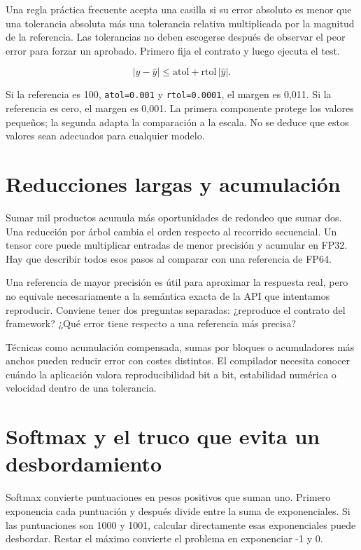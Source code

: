 \documentclass[12pt,a4paper,oneside]{report}
\begin{document}
Una regla práctica frecuente acepta una casilla si su error absoluto es menor que una tolerancia absoluta más una tolerancia relativa multiplicada por la magnitud de la referencia. Las tolerancias no deben escogerse después de observar el peor error para forzar un aprobado. Primero fija el contrato y luego ejecuta el test.

\[
|y-\widehat y|\leq \mathrm{atol}+\mathrm{rtol}\,|\widehat y|.
\]
\begin{ejemplo}
Si la referencia es 100, \texttt{atol=0.001} y \texttt{rtol=0.0001}, el margen es 0,011. Si la referencia es cero, el margen es 0,001. La primera componente protege los valores pequeños; la segunda adapta la comparación a la escala. No se deduce que estos valores sean adecuados para cualquier modelo.

\end{ejemplo}
\section{Reducciones largas y acumulación}
Sumar mil productos acumula más oportunidades de redondeo que sumar dos. Una reducción por árbol cambia el orden respecto al recorrido secuencial. Un tensor core puede multiplicar entradas de menor precisión y acumular en FP32. Hay que describir todos esos pasos al comparar con una referencia de FP64.

Una referencia de mayor precisión es útil para aproximar la respuesta real, pero no equivale necesariamente a la semántica exacta de la API que intentamos reproducir. Conviene tener dos preguntas separadas: ¿reproduce el contrato del framework? ¿Qué error tiene respecto a una referencia más precisa?

Técnicas como acumulación compensada, sumas por bloques o acumuladores más anchos pueden reducir error con costes distintos. El compilador necesita conocer cuándo la aplicación valora reproducibilidad bit a bit, estabilidad numérica o velocidad dentro de una tolerancia.

\section{Softmax y el truco que evita un desbordamiento}
Softmax convierte puntuaciones en pesos positivos que suman uno. Primero exponencia cada puntuación y después divide entre la suma de exponenciales. Si las puntuaciones son 1000 y 1001, calcular directamente esas exponenciales puede desbordar. Restar el máximo convierte el problema en exponenciar -1 y 0.
\end{document}
